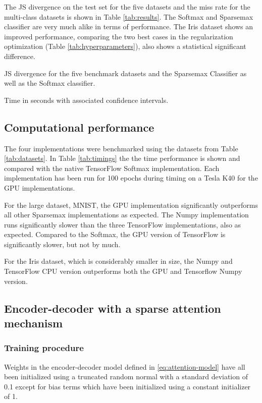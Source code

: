 The JS divergence on the test set for the five datasets and the miss rate for the multi-class datasets is shown in Table \ref{tab:results}. The Softmax and Sparsemax classifier are very much alike in terms of performance. The Iris dataset shows an improved performance, comparing the two best cases in the regularization optimization (Table \ref{tab:hyperparameters}), also shows a statistical significant difference.

\begin{table}[H]
\centering

\caption{JS divergence for the five benchmark datasets and the Sparsemax Classifier as well as the Softmax classifier.}
\label{tab:results}
\end{table}

\begin{table}
\centering

\caption{Time in seconds with associated confidence intervals.}
\label{tab:timings}
\end{table}

\subsection{Computational performance}
The four implementations were benchmarked using the datasets from Table \ref{tab:datasets}. In Table \ref{tab:timings} the the time performance is shown and compared with the native TensorFlow Softmax implementation. Each implementation has been run for 100 epochs during timing on a Tesla K40 for the GPU implementations.

For the large dataset, MNIST, the GPU implementation significantly outperforms all other Sparsemax implementations as expected. The Numpy implementation runs significantly slower than the three TensorFlow implementations, also as expected. Compared to the Softmax, the GPU version of TensorFlow is significantly slower, but not by much.

For the Iris dataset, which is considerably smaller in size, the Numpy and TensorFlow CPU version outperforms both the GPU and Tensorflow Numpy version.

\subsection{Encoder-decoder with a sparse attention mechanism}
\subsubsection{Training procedure}
Weights in the encoder-decoder model defined in \eqref{eq:attention-model} have all been initialized using a truncated random normal with a standard deviation of 0.1 except for bias terms which have been initialized using a constant initializer of 1. 

